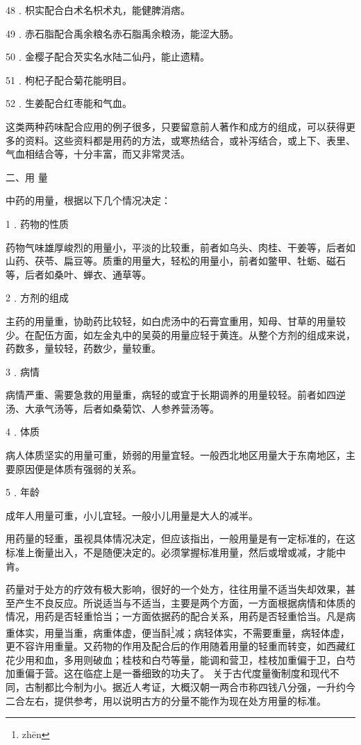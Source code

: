\documentclass[12pt,UTF8]{ctexbook}
\begin{document}
48﹒枳实配合白术名枳术丸，能健脾消痞。

49﹒赤石脂配合禹余粮名赤石脂禹余粮汤，能涩大肠。

50﹒金樱子配合芡实名水陆二仙丹，能止遗精。

51﹒枸杞子配合菊花能明目。

52﹒生姜配合红枣能和气血。

这类两种药味配合应用的例子很多，只要留意前人著作和成方的组成，可以获得更多的资料。这些资料都是用药的方法，或寒热结合，或补泻结合，或上下、表里、气血相结合等，十分丰富，而又非常灵活。

二、用 量

中药的用量，根据以下几个情况决定：

1﹒药物的性质

药物气味雄厚峻烈的用量小，平淡的比较重，前者如乌头、肉桂、干姜等，后者如山药、茯苓、扁豆等。质重的用量大，轻松的用量小，前者如鳖甲、牡蛎、磁石等，后者如桑叶、蝉衣、通草等。

2﹒方剂的组成

主药的用量重，协助药比较轻，如白虎汤中的石膏宜重用，知母、甘草的用量较少。在配伍方面，如左金丸中的吴萸的用量应轻于黄连。从整个方剂的组成来说，药数多，量较轻，药数少，量较重。

3﹒病情

病情严重、需要急救的用量重，病轻的或宜于长期调养的用量较轻。前者如四逆汤、大承气汤等，后者如桑菊饮、人参养营汤等。

4﹒体质

病人体质坚实的用量可重，娇弱的用量宜轻。一般西北地区用量大于东南地区，主要原因便是体质有强弱的关系。

5﹒年龄

成年人用量可重，小儿宜轻。一般小儿用量是大人的减半。

用药量的轻重，虽视具体情况决定，但应该指出，一般用量是有一定标准的，在这标准上衡量出入，不是随便决定的。必须掌握标准用量，然后或增或减，才能中肯。

药量对于处方的疗效有极大影响，很好的一个处方，往往用量不适当失却效果，甚至产生不良反应。所说适当与不适当，主要是两个方面，一方面根据病情和体质的情况，用药是否轻重恰当；一方面依据药的配合关系，用药是否轻重恰当。凡是病重体实，用量当重，病重体虚，便当酙\footnote{zh\=en}减；病轻体实，不需要重量，病轻体虚，更不容许用重量。又药物的作用及配合后的作用随着用量的轻重而转变，如西藏红花少用和血，多用则破血；桂枝和白芍等量，能调和营卫，桂枝加重偏于卫，白芍加重偏于营。这在临症上是一番细致的功夫了。
关于古代度量衡制度和现代不同，古制都比今制为小。据近人考证，大概汉朝一两合市称四钱八分强，一升约今二合左右，提供参考，用以说明古方的分量不能作为现在处方用量的标准。
\end{document}
